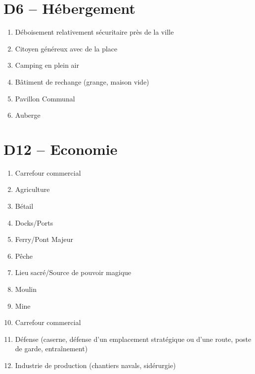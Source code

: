 \documentclass{article}
\begin{document}
\begin{multicols}{2}
	\section*{D6 -- Hébergement}
	\begin{enumerate}
		\item Déboisement relativement sécuritaire près de la ville
		\item Citoyen généreux avec de la place
		\item Camping en plein air
		\item Bâtiment de rechange (grange, maison vide)
		\item Pavillon Communal
		\item Auberge
	\end{enumerate}
	\section*{D12 -- Economie}
	\begin{enumerate}
		\item Carrefour commercial
		\item Agriculture
		\item Bétail
		\item Docks/Ports
		\item Ferry/Pont Majeur
		\item Pêche
		\item Lieu sacré/Source de pouvoir magique
		\item Moulin
		\item Mine
		\item Carrefour commercial
		\item Défense (caserne, défense d'un emplacement stratégique ou d'une route, poste de garde, entraînement)
		\item Industrie de production (chantiers navals, sidérurgie)
	\end{enumerate}

\end{multicols}
\end{document}
